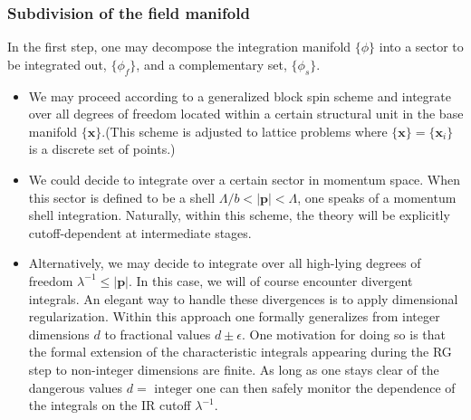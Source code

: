 \subsubsection{Subdivision of the field manifold}
In the first step, one may decompose the integration manifold $\{\phi\}$ into a sector to be integrated out, $\{\phi_f\}$, and a complementary set, $\{\phi_s\}$.
\begin{itemize}
\item We may proceed according to a generalized block spin scheme and integrate over all degrees of freedom located within a certain structural unit in the base manifold $\{\bm{x}\}$.(This scheme is adjusted to lattice problems where $\{\bm{x}\} = \{\bm{x}_i\}$ is a discrete set of points.)
\item We could decide to integrate over a certain sector in momentum space. When this sector is defined to be a shell $\Lambda /b < |\bm{p}| < \Lambda$, one speaks of a momentum shell integration. Naturally, within this scheme, the theory will be explicitly cutoff-dependent at intermediate stages.
\item Alternatively, we may decide to integrate over all high-lying degrees of freedom $\lambda^{-1} \leq |\bm{p}|$.
In this case, we will of course encounter divergent integrals. An elegant way to handle these divergences is to apply dimensional regularization. Within this approach one formally generalizes from integer dimensions $d$ to fractional values $d \pm \epsilon$. 
One motivation for doing so is that the formal extension of the characteristic integrals appearing during the RG step to non-integer dimensions are finite. As long as one stays clear of the dangerous values $d = \mbox{ integer}$ one can then safely monitor the dependence of the integrals on the IR cutoff $\lambda^{-1}$.
\end{itemize}


